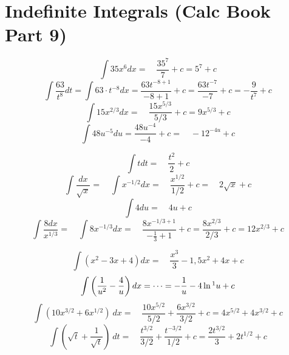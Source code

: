 \documentclass{report}
\begin{document}
\begin{multicols}{2}
\begin{center}
\end{center}

\end{multicols}


\section{Indefinite Integrals (Calc Book Part 9)}

\[\int 35 x^6 dx =\quad \frac{35^7}{7}+c = 5^7+c\]
\[\int \frac{63}{t^8}dt = \int 63\cdot t^{-8} dx = \frac{63t^{-8+1}}{-8+1}+c= \frac{63t^{-7}}{-7}+c = -\frac{9}{t^7}+c\]
\[\int 15x^{2/3}dx=\quad \frac{15x^{5/3}}{5/3}+c = 9x^{5/3}+c\]
\[\int 48u^{-5}du= \frac{48u^{-4}}{-4}+c =\quad -12^{-4u}+c\]

\[\int t dt =\quad \frac{t^2}{2}+c\]
\[\int \frac{dx}{\sqrt{x}}=\quad \int x^{-1/2}dx =\quad \frac{x^{1/2}}{1/2}+c=\quad 2\sqrt{x}+c\]
\[\int 4 du =\quad 4u+c\]
\[\int \frac{8dx}{x^{1/3}} =\quad \int 8x^{-1/3}dx =\quad \frac{8x^{-1/3+1}}{-\frac{1}{3}+1}+c = \frac{8x^{2/3}}{2/3}+c = 12x^{2/3}+c \]

\[\int (x^2-3x+4)dx =\quad \frac{x^3}{3}-1,5x^2+4x+c\]
\[\int \left(\frac{1}{u^2}-\frac{4}{u}\right)dx = \dots = -\frac{1}{u}-4\ln\footnote{Recall that a power of $b=-1$ is a special case : $\int \frac{du}{u}=\int u^{-1}du=\ln u+c$} u+c \]
\[\int (10x^{3/2}+6x^{1/2})\ dx =\quad \frac{10x^{5/2}}{5/2}+\frac{6x^{3/2}}{3/2}+c = 4x^{5/2}+4x^{3/2}+c\]
\[\int \left(\sqrt{t}+\frac{1}{\sqrt{t}}\right)\ dt =\quad \frac{t^{3/2}}{3/2}+\frac{t^{-3/2}}{1/2}+c= \frac{2t^{3/2}}{3}+2t^{1/2}+c \]

\clearpage
\end{document}
